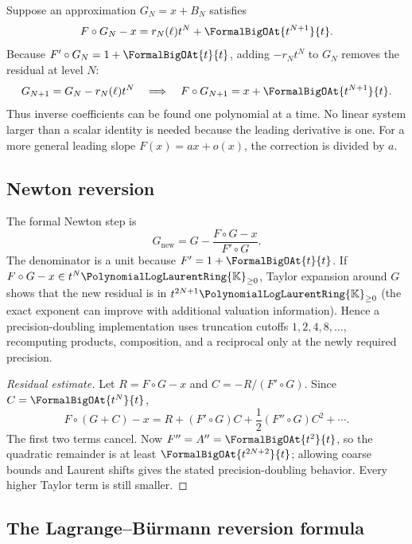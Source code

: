 \documentclass[11pt,oneside]{article}
\numberwithin{equation}{section}
\theoremstyle{definition}
\newcommand{\K}{\mathbb{K}}
\newcommand{\PL}{\PolynomialLogLaurentRing{\K}}
\begin{document}
Suppose an approximation \(G_N=x+B_N\) satisfies
\begin{equation}\label{eq:residual-order-N}
  F\circ G_N-x=r_N(\ell)t^N+\FormalBigOAt{t^{N+1}}{t}.
\end{equation}
Because \(F'\circ G_N=1+\FormalBigOAt{t}{t}\), adding
\(-r_Nt^N\) to \(G_N\) removes the residual at level \(N\):
\begin{equation}\label{eq:triangular-update}
  G_{N+1}=G_N-r_N(\ell)t^N
  \quad\Longrightarrow\quad
  F\circ G_{N+1}=x+\FormalBigOAt{t^{N+1}}{t}.
\end{equation}
Thus inverse coefficients can be found one polynomial at a time.  No linear
system larger than a scalar identity is needed because the leading derivative is
one.  For a more general leading slope \(F(x)=ax+o(x)\), the correction is divided
by \(a\).

\subsection{Newton reversion}

The formal Newton step is
\begin{equation}\label{eq:newton-reversion}
\boxed{
  G_{\mathrm{new}}
  =G-\frac{F\circ G-x}{F'\circ G}.
}
\end{equation}
The denominator is a unit because \(F'=1+\FormalBigOAt{t}{t}\).  If
\(F\circ G-x\in t^N{\PL}_{\ge0}\), Taylor expansion around \(G\) shows that the
new residual is in \(t^{2N+1}{\PL}_{\ge0}\) (the exact exponent can improve with
additional valuation information).  Hence a precision-doubling implementation
uses truncation cutoffs
\(1,2,4,8,\ldots\), recomputing products, composition, and a reciprocal only at
the newly required precision.

\begin{proof}[Residual estimate]
Let \(R=F\circ G-x\) and \(C=-R/(F'\circ G)\).  Since \(C=\FormalBigOAt{t^N}{t}\),
\[
 F\circ(G+C)-x
 =R+(F'\circ G)C+\frac12(F''\circ G)C^2+\cdots.
\]
The first two terms cancel.  Now \(F''=A''=\FormalBigOAt{t^2}{t}\), so the quadratic
remainder is at least \(\FormalBigOAt{t^{2N+2}}{t}\); allowing coarse bounds and Laurent
shifts gives the stated precision-doubling behavior.  Every higher Taylor term
is still smaller.
\end{proof}

\subsection{The Lagrange--B\"urmann reversion formula}
\end{document}
